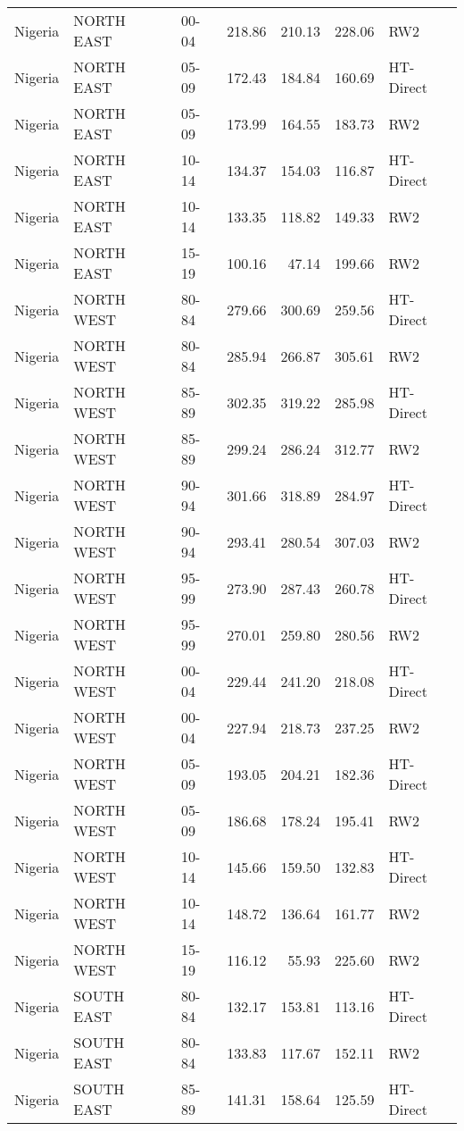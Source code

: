 \begin{longtable}{lllrrrl}
  Nigeria & NORTH EAST & 00-04 & 218.86 & 210.13 & 228.06 & RW2 \\ 
  Nigeria & NORTH EAST & 05-09 & 172.43 & 184.84 & 160.69 & HT-Direct \\ 
  Nigeria & NORTH EAST & 05-09 & 173.99 & 164.55 & 183.73 & RW2 \\ 
  Nigeria & NORTH EAST & 10-14 & 134.37 & 154.03 & 116.87 & HT-Direct \\ 
  Nigeria & NORTH EAST & 10-14 & 133.35 & 118.82 & 149.33 & RW2 \\ 
  Nigeria & NORTH EAST & 15-19 & 100.16 & 47.14 & 199.66 & RW2 \\ 
  Nigeria & NORTH WEST & 80-84 & 279.66 & 300.69 & 259.56 & HT-Direct \\ 
  Nigeria & NORTH WEST & 80-84 & 285.94 & 266.87 & 305.61 & RW2 \\ 
  Nigeria & NORTH WEST & 85-89 & 302.35 & 319.22 & 285.98 & HT-Direct \\ 
  Nigeria & NORTH WEST & 85-89 & 299.24 & 286.24 & 312.77 & RW2 \\ 
  Nigeria & NORTH WEST & 90-94 & 301.66 & 318.89 & 284.97 & HT-Direct \\ 
  Nigeria & NORTH WEST & 90-94 & 293.41 & 280.54 & 307.03 & RW2 \\ 
  Nigeria & NORTH WEST & 95-99 & 273.90 & 287.43 & 260.78 & HT-Direct \\ 
  Nigeria & NORTH WEST & 95-99 & 270.01 & 259.80 & 280.56 & RW2 \\ 
  Nigeria & NORTH WEST & 00-04 & 229.44 & 241.20 & 218.08 & HT-Direct \\ 
  Nigeria & NORTH WEST & 00-04 & 227.94 & 218.73 & 237.25 & RW2 \\ 
  Nigeria & NORTH WEST & 05-09 & 193.05 & 204.21 & 182.36 & HT-Direct \\ 
  Nigeria & NORTH WEST & 05-09 & 186.68 & 178.24 & 195.41 & RW2 \\ 
  Nigeria & NORTH WEST & 10-14 & 145.66 & 159.50 & 132.83 & HT-Direct \\ 
  Nigeria & NORTH WEST & 10-14 & 148.72 & 136.64 & 161.77 & RW2 \\ 
  Nigeria & NORTH WEST & 15-19 & 116.12 & 55.93 & 225.60 & RW2 \\ 
  Nigeria & SOUTH EAST & 80-84 & 132.17 & 153.81 & 113.16 & HT-Direct \\ 
  Nigeria & SOUTH EAST & 80-84 & 133.83 & 117.67 & 152.11 & RW2 \\ 
  Nigeria & SOUTH EAST & 85-89 & 141.31 & 158.64 & 125.59 & HT-Direct \\ 

\end{longtable}
